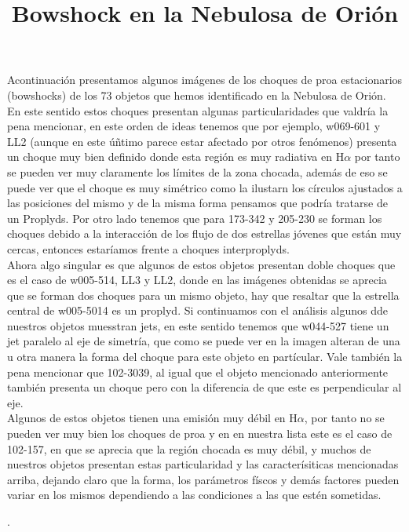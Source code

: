 \documentclass{article}
\title{Bowshock en la Nebulosa de Orión}
\newcommand\ha{\ensuremath{\mathrm{H}\alpha}}
\begin{document}
\maketitle
Acontinuación presentamos algunos imágenes de los choques de proa estacionarios (bowshocks) de los 73 objetos que hemos identificado en la Nebulosa de Orión. En este sentido estos choques presentan algunas particularidades que valdría la pena mencionar, en este orden de ideas tenemos que por ejemplo, w069-601 y LL2 (aunque en este úñtimo parece estar afectado por otros fenómenos) presenta un choque muy bien definido donde esta región es muy radiativa en \(\ha\) por tanto se pueden ver muy claramente los límites de la zona chocada, además de eso se puede ver que el choque es muy simétrico como la ilustarn los círculos ajustados a las posiciones del mismo y de la misma forma pensamos que podría tratarse de un Proplyds. Por otro lado tenemos que para 173-342 y 205-230 se forman los choques debido a la interacción de los flujo de dos estrellas jóvenes que están muy cercas, entonces estaríamos frente a choques interproplyds.\\

Ahora algo singular es que algunos de estos objetos presentan doble choques que es el caso de w005-514, LL3 y LL2, donde en las imágenes obtenidas se aprecia que se forman dos choques para un mismo objeto, hay que resaltar que la estrella central de w005-5014 es un proplyd. Si continuamos con el análisis algunos dde nuestros objetos muesstran jets, en este sentido tenemos que w044-527 tiene un jet paralelo al eje de simetría, que como se puede ver en la imagen alteran de una u otra manera la forma del choque para este objeto en partícular. Vale también la pena mencionar que 102-3039, al igual que el objeto mencionado anteriormente también presenta un choque pero con la diferencia de que este es perpendicular al eje.\\

Algunos de estos objetos tienen una emisión muy débil en \(\ha\), por tanto no se pueden ver muy bien los choques de proa y en en nuestra lista este es el caso de 102-157, en que se aprecia que la región chocada es muy débil, y muchos de nuestros objetos presentan estas particularidad y las caracterísiticas mencionadas arriba, dejando claro que la forma, los parámetros físcos y demás factores pueden variar en los mismos dependiendo a las condiciones a las que estén sometidas. 

  

. 
\end{document}
